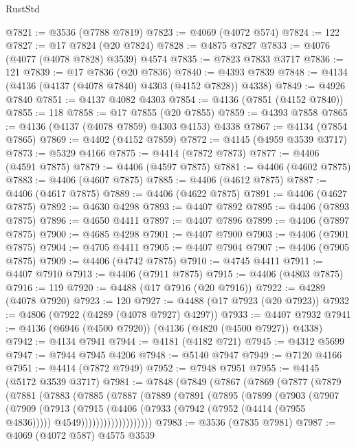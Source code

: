 \begin{lexlean}{RustStd}
\begin{coremodule}
{\begin{coremodule}
{{{{{{{{{{{{{{{{{{{{{{{{{{{{{{{{{{{{{{{{{{{{{{{{{{@7821 := @3536 (@7788 @7819)
@7823 := @4069 (@4072 @574)
@7824 := 122
@7827 := @17 @7824 (@20 @7824)
@7828 := @4875 @7827
@7833 := @4076 (@4077 (@4078 @7828) @3539) @4574
@7835 := @7823 @7833 @3717
@7836 := 121
@7839 := @17 @7836 (@20 @7836)
@7840 := @4393 @7839
@7848 := @4134 (@4136 (@4137 (@4078 @7840) @4303 (@4152 @7828)) @4338)
@7849 := @4926 @7840
@7851 := @4137 @4082 @4303
@7854 := @4136 (@7851 (@4152 @7840))
@7855 := 118
@7858 := @17 @7855 (@20 @7855)
@7859 := @4393 @7858
@7865 := @4136 (@4137 (@4078 @7859) @4303 @4153) @4338
@7867 := @4134 (@7854 @7865)
@7869 := @4402 (@4152 @7859)
@7872 := @4145 (@4959 @3539 @3717)
@7873 := @5329 @4166
@7875 := @4414 (@7872 @7873)
@7877 := @4406 (@4591 @7875)
@7879 := @4406 (@4597 @7875)
@7881 := @4406 (@4602 @7875)
@7883 := @4406 (@4607 @7875)
@7885 := @4406 (@4612 @7875)
@7887 := @4406 (@4617 @7875)
@7889 := @4406 (@4622 @7875)
@7891 := @4406 (@4627 @7875)
@7892 := @4630 @4298
@7893 := @4407 @7892
@7895 := @4406 (@7893 @7875)
@7896 := @4650 @4411
@7897 := @4407 @7896
@7899 := @4406 (@7897 @7875)
@7900 := @4685 @4298
@7901 := @4407 @7900
@7903 := @4406 (@7901 @7875)
@7904 := @4705 @4411
@7905 := @4407 @7904
@7907 := @4406 (@7905 @7875)
@7909 := @4406 (@4742 @7875)
@7910 := @4745 @4411
@7911 := @4407 @7910
@7913 := @4406 (@7911 @7875)
@7915 := @4406 (@4803 @7875)
@7916 := 119
@7920 := @4488 (@17 @7916 (@20 @7916))
@7922 := @4289 (@4078 @7920)
@7923 := 120
@7927 := @4488 (@17 @7923 (@20 @7923))
@7932 := @4806 (@7922 (@4289 (@4078 @7927) @4297))
@7933 := @4407 @7932
@7941 := @4136 (@6946 (@4500 @7920)) (@4136 (@4820 (@4500 @7927)) @4338)
@7942 := @4134 @7941
@7944 := @4181 (@4182 @721)
@7945 := @4312 @5699
@7947 := @7944 @7945 @4206
@7948 := @5140 @7947
@7949 := @7120 @4166
@7951 := @4414 (@7872 @7949)
@7952 := @7948 @7951
@7955 := @4145 (@5172 @3539 @3717)
@7981 := @7848
    (@7849
      (@7867
        (@7869
          (@7877
            (@7879
              (@7881
                (@7883
                  (@7885
                    (@7887
                      (@7889
                        (@7891
                          (@7895
                            (@7899
                              (@7903
                                (@7907
                                  (@7909
                                    (@7913
                                      (@7915
                                        (@4406
                                          (@7933 (@7942 (@7952 (@4414 (@7955 @4836)))))
                                          @4549)))))))))))))))))))
@7983 := @3536 (@7835 @7981)
@7987 := @4069 (@4072 @587) @4575 @3539
}}}}}}}}}}}}}}}}}}}}}}}}}}}}}}}}}}}}}}}}}}}}}}}}}}
\end{coremodule}}
\end{coremodule}
\end{lexlean}
